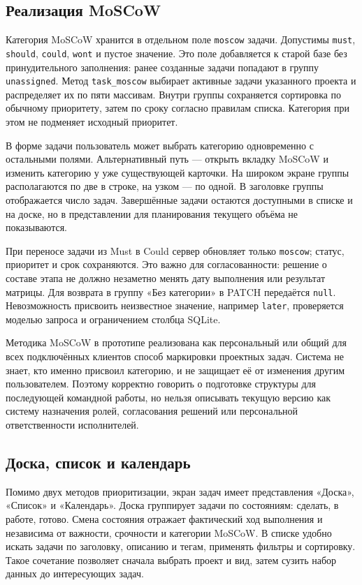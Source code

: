 \documentclass[14pt,a4paper]{extarticle}
\begin{document}
\subsection{Реализация MoSCoW}

Категория MoSCoW хранится в отдельном поле \texttt{moscow} задачи. Допустимы \texttt{must}, \texttt{should}, \texttt{could}, \texttt{wont} и пустое значение. Это поле добавляется к старой базе без принудительного заполнения: ранее созданные задачи попадают в группу \texttt{unassigned}. Метод \texttt{task\_moscow} выбирает активные задачи указанного проекта и распределяет их по пяти массивам. Внутри группы сохраняется сортировка по обычному приоритету, затем по сроку согласно правилам списка. Категория при этом не подменяет исходный приоритет.

В форме задачи пользователь может выбрать категорию одновременно с остальными полями. Альтернативный путь --- открыть вкладку MoSCoW и изменить категорию у уже существующей карточки. На широком экране группы располагаются по две в строке, на узком --- по одной. В заголовке группы отображается число задач. Завершённые задачи остаются доступными в списке и на доске, но в представлении для планирования текущего объёма не показываются.

При переносе задачи из Must в Could сервер обновляет только \texttt{moscow}; статус, приоритет и срок сохраняются. Это важно для согласованности: решение о составе этапа не должно незаметно менять дату выполнения или результат матрицы. Для возврата в группу «Без категории» в PATCH передаётся \texttt{null}. Невозможность присвоить неизвестное значение, например \texttt{later}, проверяется моделью запроса и ограничением столбца SQLite.

Методика MoSCoW в прототипе реализована как персональный или общий для всех подключённых клиентов способ маркировки проектных задач. Система не знает, кто именно присвоил категорию, и не защищает её от изменения другим пользователем. Поэтому корректно говорить о подготовке структуры для последующей командной работы, но нельзя описывать текущую версию как систему назначения ролей, согласования решений или персональной ответственности исполнителей.

\subsection{Доска, список и календарь}

Помимо двух методов приоритизации, экран задач имеет представления «Доска», «Список» и «Календарь». Доска группирует задачи по состояниям: сделать, в работе, готово. Смена состояния отражает фактический ход выполнения и независима от важности, срочности и категории MoSCoW. В списке удобно искать задачи по заголовку, описанию и тегам, применять фильтры и сортировку. Такое сочетание позволяет сначала выбрать проект и вид, затем сузить набор данных до интересующих задач.
\end{document}
